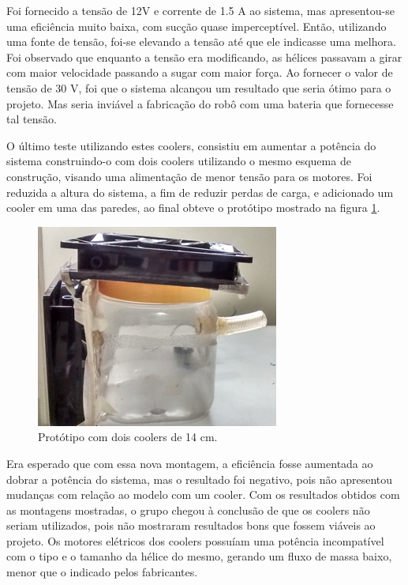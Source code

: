 		Foi fornecido a tensão de 12V e corrente de 1.5 A ao sistema, mas apresentou-se uma eficiência muito baixa, com sucção quase imperceptível. Então, utilizando uma fonte de tensão, foi-se elevando a tensão até que ele indicasse uma melhora. Foi observado que enquanto a tensão era modificando, as hélices passavam a girar com maior velocidade passando a sugar com maior força. Ao fornecer o valor de tensão de 30 V, foi que o sistema alcançou um resultado que seria ótimo para o projeto. Mas seria inviável a fabricação do robô com uma bateria que fornecesse tal tensão. 

		O último teste utilizando estes coolers, consistiu em aumentar a potência do sistema construindo-o com dois coolers utilizando o mesmo esquema de construção, visando uma alimentação de menor tensão para os motores. Foi reduzida a altura do sistema, a fim de reduzir perdas de carga, e adicionado um cooler em uma das paredes, ao final obteve o protótipo mostrado na figura \ref{img:coolers_14cm}.

		\begin{figure}[H]
			\centering
			\includegraphics[scale=1]{figuras/asppc2_4.jpg}
			\caption{Protótipo com dois coolers de 14 cm.}
			\label{img:coolers_14cm}
		\end{figure}

		Era esperado que com essa nova montagem, a eficiência fosse aumentada ao dobrar a potência do sistema, mas o resultado foi negativo, pois não apresentou mudanças com relação ao modelo com um cooler. Com os resultados obtidos com as montagens mostradas, o grupo chegou à conclusão de que os coolers não seriam utilizados, pois não mostraram resultados bons que fossem viáveis ao projeto. Os motores elétricos dos coolers possuíam uma potência incompatível com o tipo e o tamanho da hélice do mesmo, gerando um fluxo de massa baixo, menor que o indicado pelos fabricantes. 

